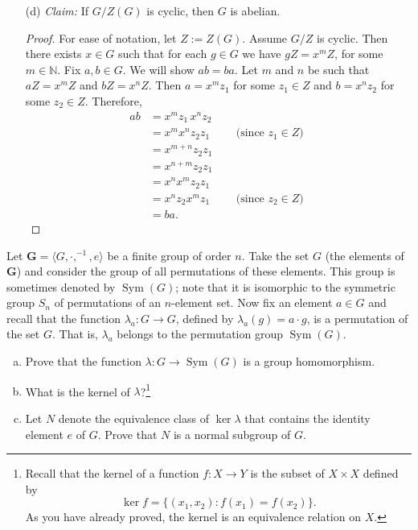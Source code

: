 \documentclass[12pt,reqno]{amsart}
\newcommand{\N}{\ensuremath{\mathbb{N}}}
\newcommand{\bG}{\ensuremath{\mathbf{G}}}
\newcommand{\<}{\ensuremath{\langle}}
\renewcommand{\>}{\ensuremath{\rangle}}
\newcommand{\Sym}{\ensuremath{\operatorname{Sym}}}
\begin{document}
\begin{enumerate}
\begin{enumerate}
 \item[(d)]
\emph{Claim:} 
If $G / Z(G)$ is cyclic, then $G$ is abelian.

\smallskip

\noindent
\begin{proof}
For ease of notation, let $Z := Z(G)$.  Assume 
$G/Z$ is cyclic. Then there exists $x\in G$ such that for each $g\in G$ 
  we have $gZ = x^mZ$, for some $m\in \N$.
  Fix $a, b\in G$.  We will show $ab = ba$.
  Let $m$ and $n$ be such that $aZ = x^mZ$ and $bZ = x^nZ$.
  Then $a = x^mz_1$ for some $z_1 \in Z$ and 
  $b = x^nz_2$ for some $z_2 \in Z$.  Therefore,
  \begin{align*}
    a b &= x^m z_1\, x^n z_2\\
    &= x^m x^n z_2 z_1 \qquad \text{ (since $z_1 \in Z$) }\\
    &= x^{m+n} z_2 z_1\\
    &= x^{n+m} z_2 z_1\\
    &= x^nx^m z_2 z_1\\
    &= x^nz_2 x^m z_1 \qquad \text{ (since $z_2 \in Z$) }\\
    &= b a.
  \end{align*}
\end{proof}
 
\end{enumerate}
 
\end{enumerate}

\newpage

 Let $\bG = \<G, \cdot, ^{-1}, e\>$ be a finite group of order $n$.  
Take the set $G$ (the elements of $\bG$) and consider the group of all
permutations of these elements.  This group is sometimes denoted by $\Sym(G)$;
note that it is isomorphic to the symmetric group $S_n$ of permutations of
an $n$-element set.
Now fix an element $a\in G$ and recall that the function
$\lambda_a: G \rightarrow G$, defined by $\lambda_a(g) = a\cdot g$, is a
permutation of the set $G$.  That is, $\lambda_a$ belongs to the
permutation group $\Sym(G)$.


\bigskip

\begin{enumerate}[(a)]
\item 
Prove that the function $\lambda: G \rightarrow \Sym(G)$ is a group
homomorphism.  

\medskip

\item What is the kernel of $\lambda$?\footnote{Recall that the kernel of a function $f: X \rightarrow Y$ is the subset of
  $X\times X$ defined by 
\[
\ker f = \{(x_1,x_2) : f(x_1) = f(x_2)\}.
\]
As you have already proved, the kernel is an equivalence relation on $X$.}


\medskip

\item Let $N$ denote the equivalence class of $\ker\lambda$ that contains the
  identity element $e$ of $G$.  Prove that $N$ is a normal subgroup of $G$.
\end{enumerate}
\end{document}
